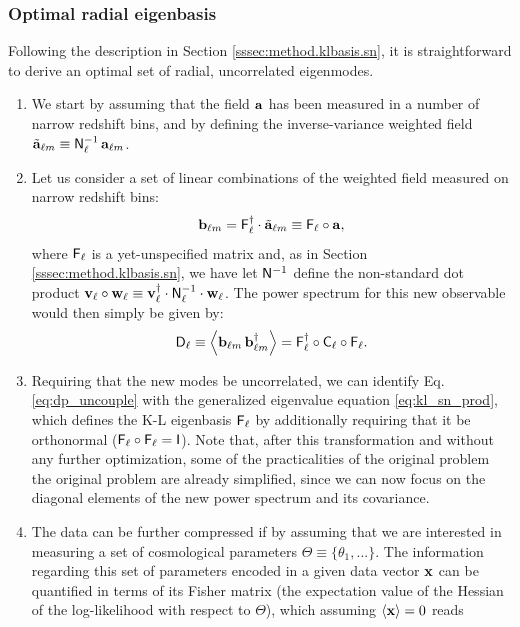 \documentclass[twocolumn,amsfont,amssymb,amsmath, showpacs,balancelastpage, nofootinbib]{revtex4-1}
\begin{document}
    \subsubsection{Optimal radial eigenbasis}\label{sssec:method.tomographic.kl}
      Following the description in Section \ref{sssec:method.klbasis.sn}, it is straightforward to derive an optimal set of radial, uncorrelated eigenmodes.
      \begin{enumerate}
        \item We start by assuming that the field ${\bf a}$ has been measured in a number of narrow redshift bins, and by defining the inverse-variance weighted field $\tilde{\bf a}_{\ell m}\equiv{\sf N}^{-1}_\ell\,{\bf a}_{\ell m}$.
        \item Let us consider a set of linear combinations of the weighted field measured on narrow redshift bins:
        \begin{equation}
          {\bf b}_{\ell m}={\sf F}_\ell^\dag\cdot\tilde{\bf a}_{\ell m}\equiv{\sf F}_\ell\circ{\bf a},
        \end{equation}
        where ${\sf F}_\ell$ is a yet-unspecified matrix and, as in Section \ref{sssec:method.klbasis.sn}, we have let ${\sf N}^{-1}$ define the non-standard dot product ${\bf v}_\ell\circ{\bf w}_\ell\equiv{\bf v}^\dag_\ell\cdot{\sf N}^{-1}_\ell\cdot{\bf w}_\ell$. The power spectrum for this new observable would then simply be given by:
        \begin{equation}\label{eq:dp_uncouple}
          {\sf D}_\ell\equiv\left\langle{\bf b}_{\ell m}\,{\bf b}^\dag_{\ell m}\right\rangle={\sf F}_\ell^\dag\circ{\sf C}_\ell\circ{\sf F}_\ell.
        \end{equation}
        \item Requiring that the new modes be uncorrelated, we can identify Eq. \ref{eq:dp_uncouple} with the generalized eigenvalue equation \ref{eq:kl_sn_prod}, which defines the K-L eigenbasis ${\sf F}_\ell$ by additionally requiring that it be orthonormal (${\sf F}_\ell\circ{\sf F}_\ell={\sf I}$). Note that, after this transformation and without any further optimization, some of the practicalities of the original problem the original problem are already simplified, since we can now focus on the diagonal elements of the new power spectrum and its covariance.
        \item The data can be further compressed if by assuming that we are interested in measuring a set of cosmological parameters $\Theta\equiv\{\theta_1,...\}$. The information regarding this set of parameters encoded in a given data vector ${\bf x}$ can be quantified in terms of its Fisher matrix (the expectation value of the Hessian of the log-likelihood with respect to $\Theta$), which assuming $\langle{\bf x}\rangle=0$ reads

\end{enumerate}
\end{document}
